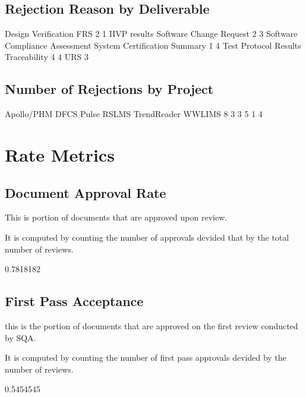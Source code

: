 \documentclass{article}
\begin{document}
\subsection{Rejection Reason by Deliverable}

\begin{Schunk}
\begin{Soutput}
           Design Verification                            FRS 
                             2                              1 
                  IIVP results        Software Change Request 
                             2                              3 
Software Compliance Assessment   System Certification Summary 
                             1                              4 
         Test Protocol Results                   Traceability 
                             4                              4 
                           URS 
                             3 
\end{Soutput}
\end{Schunk}

\subsection{Number of Rejections by Project}

\begin{Schunk}
\begin{Soutput}
 Apollo/PHM        DFCS       Pulse       RSLMS TrendReader      WWLIMS 
          8           3           3           5           1           4 
\end{Soutput}
\end{Schunk}



\section{Rate Metrics}
\subsection{Document Approval Rate}
This is portion of documents that are approved upon review.

It is computed by counting the number of approvals devided that by the total number of reviews.

\begin{Schunk}
\begin{Soutput}
[1] 0.7818182
\end{Soutput}
\end{Schunk}

\subsection{First Pass Acceptance}
this is the portion of documents that are approved on the first review conducted
by SQA.

It is computed by counting the number of first pass approvals devided by
the number of reviews.

\begin{Schunk}
\begin{Soutput}
[1] 0.5454545
\end{Soutput}
\end{Schunk}
\end{document}
